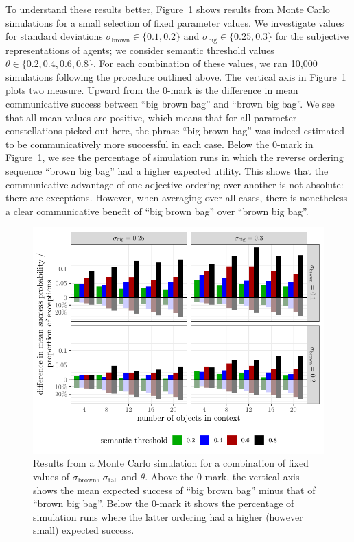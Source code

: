 \documentclass[10pt,a4paper]{article}
\begin{document}
To understand these results better, Figure~\ref{fig:Showcase_examples} shows results from Monte Carlo simulations for a small selection of fixed parameter values. We investigate values for standard deviations $\sigma_{\text{brown}} \in \{0.1, 0.2\}$ and $\sigma_{\text{big}} \in \{0.25, 0.3\}$ for the subjective representations of agents; we consider semantic threshold values $\theta \in \{ 0.2, 0.4, 0.6, 0.8 \}$. For each combination of these values, we ran 10,000 simulations following the procedure outlined above. The vertical axis in Figure~\ref{fig:Showcase_examples} plots two measure. Upward from the 0-mark is the difference in mean communicative success between ``big brown bag'' and ``brown big bag''. We see that all mean values are positive, which means that for all parameter constellations picked out here, the phrase ``big brown bag'' was indeed estimated to be communicatively more successful in each case. Below the 0-mark in Figure~\ref{fig:Showcase_examples}, we see the percentage of simulation runs in which the reverse ordering sequence ``brown big bag'' had a higher expected utility. This shows that the communicative advantage of one adjective ordering over another is not absolute: there are exceptions. However, when averaging over all cases, there is nonetheless a clear communicative benefit of ``big brown bag'' over ``brown big bag''.

\begin{figure}
  \centering
  \includegraphics[width = \linewidth]{plots/tikz_combined.pdf}
  \caption{Results from a Monte Carlo simulation for a combination of fixed values of $\sigma_{\text{brown}}$, $\sigma_{\text{tall}}$ and $\theta$. Above the 0-mark, the vertical axis shows the mean expected success of ``big brown bag'' minus that of ``brown big bag''. Below the 0-mark it shows the percentage of simulation runs where the latter ordering had a higher (however small) expected success.}
  \label{fig:Showcase_examples}
\end{figure}
\end{document}
